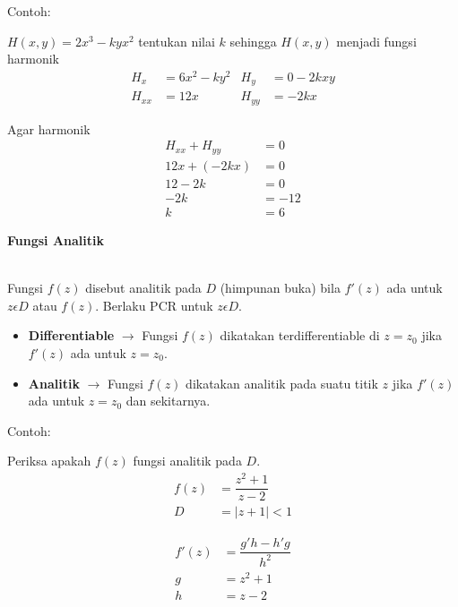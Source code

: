 \documentclass{article}
\begin{document}
Contoh:

$H(x,y) =2x^3 -kyx^2$ tentukan nilai $k$ sehingga $H(x,y)$ menjadi fungsi harmonik
\begin{align}
    H_x    & = 6x^2-ky^2 & H_y    & = 0-2kxy
    \nonumber                                \\
    H_{xx} & = 12x       & H_{yy} & = -2kx
    \nonumber
\end{align}

Agar harmonik
\begin{align}
    H_{xx} + H_{yy} & = 0
    \nonumber               \\
    12x + (-2kx)    & = 0
    \nonumber               \\
    12 - 2k         & = 0
    \nonumber               \\
    -2k             & = -12
    \nonumber               \\
    k               & = 6
    \nonumber
\end{align}

\newpage
\begin{center}
    \textbf{Fungsi Analitik}
\end{center}
\leavevmode\\

Fungsi $f(z)$ disebut analitik pada $D$ (himpunan buka) bila $f'(z)$ ada untuk $z \epsilon D$ atau $f(z)$. Berlaku PCR untuk $z \epsilon D$.
\begin{itemize}
    \item \textbf{Differentiable} $\rightarrow$ Fungsi $f(z)$ dikatakan terdifferentiable di $z=z_0$ jika $f'(z)$ ada untuk $z=z_0$.
    \item \textbf{Analitik} $\rightarrow$ Fungsi $f(z)$ dikatakan analitik pada suatu titik $z$ jika $f'(z)$ ada untuk $z=z_0$ dan sekitarnya.
\end{itemize}

Contoh:

Periksa apakah $f(z)$ fungsi analitik pada $D$.
\begin{align}
    f(z) & = \dfrac{z^2 + 1}{z - 2}
    \nonumber                       \\
    D    & = |z + 1| < 1
    \nonumber
\end{align}

\begin{align}
    f'(z) & = \dfrac{g'h - h'g}{h^2}
    \nonumber                        \\
    g     & = z^2+1
    \nonumber                        \\
    h     & = z-2
    \nonumber
\end{align}
\end{document}
